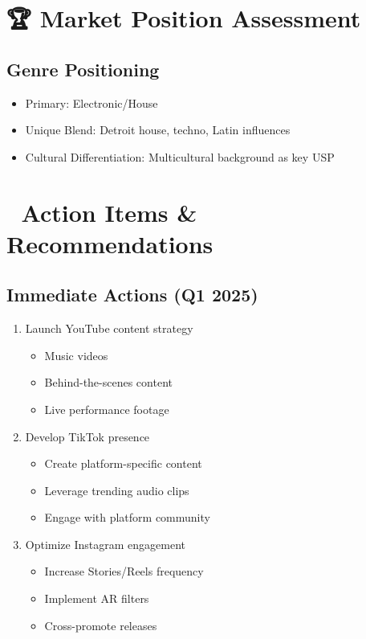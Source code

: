 \documentclass{article}
\begin{document}
\section*{🏆 Market Position Assessment}

\subsection*{Genre Positioning}
\begin{itemize}
\item Primary: Electronic/House
\item Unique Blend: Detroit house, techno, Latin influences
\item Cultural Differentiation: Multicultural background as key USP
\end{itemize}

\section*{🚀 Action Items \& Recommendations}

\subsection*{Immediate Actions (Q1 2025)}
\begin{enumerate}
\item Launch YouTube content strategy
   \begin{itemize}
   \item Music videos
   \item Behind-the-scenes content
   \item Live performance footage
   \end{itemize}
\item Develop TikTok presence
   \begin{itemize}
   \item Create platform-specific content
   \item Leverage trending audio clips
   \item Engage with platform community
   \end{itemize}
\item Optimize Instagram engagement
   \begin{itemize}
   \item Increase Stories/Reels frequency
   \item Implement AR filters
   \item Cross-promote releases
   \end{itemize}
\end{enumerate}
\end{document}
